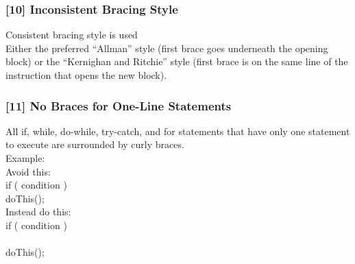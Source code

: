 \subsubsection{[10] Inconsistent Bracing Style}
Consistent bracing style is used\\
Either the preferred “Allman” style (first brace goes underneath the opening block) or the “Kernighan and Ritchie” style (first brace is on the same line of the instruction that opens the new block).
\subsubsection{[11] No Braces for One-Line Statements}
All if, while, do-while, try-catch, and for statements that have only one statement to execute are surrounded by curly braces.\\
Example:\\
Avoid this:\\
    if ( condition )\\
        doThis();\\
Instead do this:\\
    if ( condition )\\
    {\\
doThis(); }\\